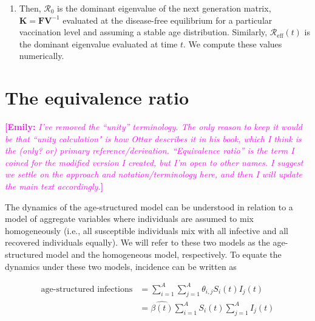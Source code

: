 \documentclass[12pt]{article}
\newcommand{\commentmacro}[3]{\textcolor{#1}{\textbf{[#2: }\textsl{#3}\textbf{]}}}
\newcommand{\emily}[1]{\commentmacro{magenta}{Emily}{#1}}
\newcommand{\Rn}{{\mathcal R}_0}
\newcommand{\Reff}{{\mathcal R}_{\textrm{eff}}}
\begin{document}
\begin{enumerate}
    and the Jacobian of $\mathcal{F}$ is
    $$
    \mathbf{F} = \Big[\frac{\partial \mathcal{F}_i}{\partial X_j}\Big] =  \begin{bmatrix}
     \theta_{1,1} S_1 & \theta_{1,2} S_1 & \cdots & \theta_{1,A} S_1 \\
    \theta_{2,1} S_2 & \theta_{2,2} S_2 & \cdots & \theta_{2,A} S_2 \\
    \vdots & \vdots & \ddots & \vdots \\
    \theta_{A,1} S_A & \theta_{A,2} S_A & \cdots & \theta_{A,A} S_A \\
    \end{bmatrix}
    $$
    \item Then, $\Rn$ is the dominant eigenvalue of the next generation matrix, $\mathbf{K} = \mathbf{F} \mathbf{V}^{-1}$ evaluated at the disease-free equilibrium for a particular vaccination level and assuming a stable age distribution. Similarly, $\Reff(t)$ is the dominant eigenvalue evaluated at time $t$. We compute these values numerically.
\end{enumerate}

\section{The equivalence ratio}
\label{sec:equivalence-ratio}
\emily{I've removed the ``unity'' terminology. The only reason to keep it would be that ``unity calculation" is how Ottar describes it in his book, which I think is the (only? or) primary reference/derivation. ``Equivalence ratio'' is the term I coined for the modified version I created, but I'm open to other names. I suggest we settle on the approach and notation/terminology here, and then I will update the main text accordingly.}

The dynamics of the age-structured model can be understood in relation to a model of aggregate variables where individuals are assumed to mix homogeneously (i.e., all susceptible individuals mix with all infective and all recovered individuals equally). We will refer to these two models as the age-structured model and the homogeneous model, respectively. To equate the dynamics under these two models, incidence can be written as 

\begin{equation}
\begin{aligned}
    \text{age-structured infections} &=  \sum_{i=1}^{A}\sum_{j=1}^{A} \theta_{i,j} S_i(t) I_j(t) \\
    &= \hat{\beta(t)}\sum_{i=1}^{A} S_i(t) \sum_{j=1}^{A} I_j(t) %
\end{aligned}
\label{eq:derive-unity-beta-simple}
\end{equation}
\end{document}
